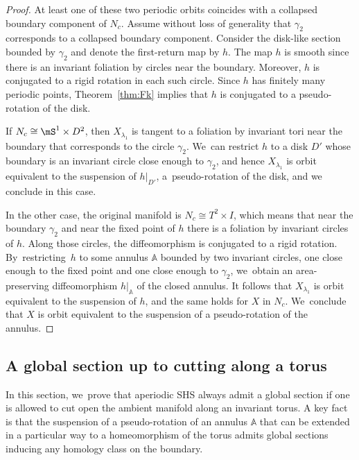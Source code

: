 \begin{proof}
At least one of these two periodic orbits coincides with a collapsed boundary component of $N_c$. Assume without loss of generality that $\gamma_2$ corresponds to a collapsed boundary component. Consider the disk-like section bounded by $\gamma_2$ and denote the first-return map by $h$. The map $h$ is smooth since there is an invariant foliation by circles near the boundary. Moreover, $h$ is conjugated to a rigid rotation in each such circle. Since $h$ has finitely many periodic points, Theorem~\ref{thm:Fk} implies that $h$ is conjugated to a pseudo-rotation of the disk.\enlargethispage{-.5\baselineskip}

If $N_c\cong \mS^1\times D^2$, then $X_{\lambda_1}$ is tangent to a foliation by invariant tori near the boundary that corresponds to the circle $\gamma_2$. We~can restrict $h$ to a disk $D'$ whose boundary is an invariant circle close enough to $\gamma_2$, and hence $X_{\lambda_1}$ is orbit equivalent to the suspension of $h|_{D'}$, a~pseudo-rotation of the disk, and we conclude in this case.

In the other case, the original manifold is $N_c\cong T^2\times I$, which means that near the boundary $\gamma_2$ and near the fixed point of $h$ there is a foliation by invariant circles of $h$. Along those circles, the diffeomorphism is conjugated to a rigid rotation. By~restricting~$h$ to some annulus $\mathbb{A}$ bounded by two invariant circles, one close enough to the fixed point and one close enough to $\gamma_2$, we~obtain an area-preserving diffeomorphism $h|_\mathbb{A}$
of the closed annulus. It follows that $X_{\lambda_1}$ is orbit equivalent to the suspension of $h$, and the same holds for $X$ in $N_c$. We~conclude that $X$ is orbit equivalent to the suspension of a pseudo-rotation of the annulus.
\end{proof}

\subsection{A global section up to cutting along a torus}

In this section, we~prove that aperiodic SHS always admit a global section if one is allowed to cut open the ambient manifold along an invariant torus. A key fact is that the suspension of a pseudo-rotation of an annulus $\mathbb{A}$ that can be extended in a particular way to a homeomorphism of the torus admits global sections inducing any homology class on the boundary.

